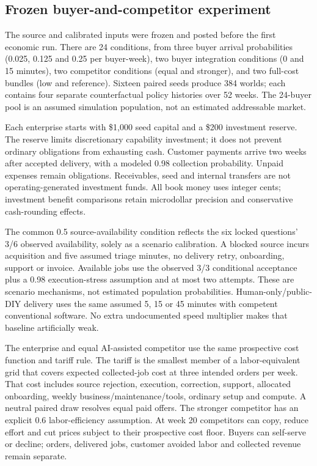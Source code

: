 \subsection{Frozen buyer-and-competitor experiment}

The source and calibrated inputs were frozen and posted before the first economic run.
There are 24 conditions, from three buyer arrival probabilities (0.025, 0.125 and 0.25 per
buyer-week), two buyer integration conditions (0 and 15 minutes), two competitor conditions
(equal and stronger), and two full-cost bundles (low and reference). Sixteen paired seeds
produce 384 worlds; each contains four separate counterfactual policy histories over 52 weeks. The
24-buyer pool is an assumed simulation population, not an estimated addressable market.

Each enterprise starts with \$1,000 seed capital and a \$200 investment reserve. The reserve
limits discretionary capability investment; it does not prevent ordinary obligations from
exhausting cash. Customer payments arrive two weeks after accepted delivery, with a modeled
0.98 collection probability. Unpaid expenses remain obligations. Receivables, seed and internal
transfers are not operating-generated investment funds. All book money uses integer cents;
investment benefit comparisons retain microdollar precision and conservative cash-rounding effects.

The common 0.5 source-availability condition reflects the six locked questions' 3/6 observed
availability, solely as a scenario calibration. A blocked source incurs acquisition and
five assumed triage minutes, no delivery retry, onboarding, support or invoice. Available
jobs use the observed 3/3 conditional acceptance plus a 0.98 execution-stress assumption
and at most two attempts. These are scenario mechanisms, not estimated population probabilities.
Human-only/public-DIY delivery uses the same assumed 5, 15 or 45 minutes with competent
conventional software. No extra undocumented speed multiplier makes that baseline artificially weak.

The enterprise and equal AI-assisted competitor use the same prospective cost function and
tariff rule. The tariff is the smallest member of a labor-equivalent grid that covers expected
collected-job cost at three intended orders per week. That cost includes source rejection,
execution, correction, support, allocated onboarding, weekly business/maintenance/tools, ordinary
setup and compute. A neutral paired draw resolves equal paid offers. The stronger competitor
has an explicit 0.6 labor-efficiency assumption. At week 20 competitors can copy, reduce effort
and cut prices subject to their prospective cost floor. Buyers can self-serve or decline;
orders, delivered jobs, customer avoided labor and collected revenue remain separate.

